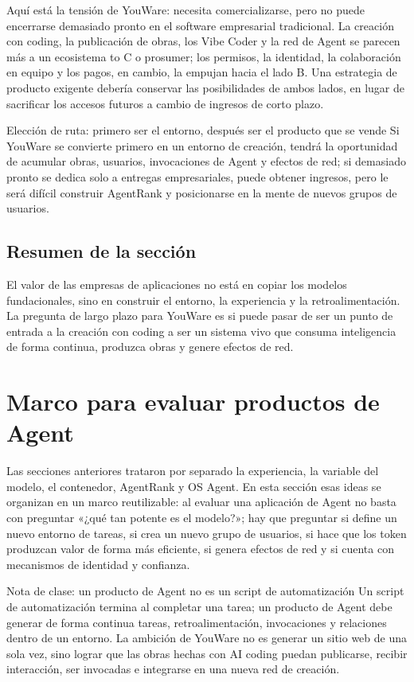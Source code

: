 \documentclass[a4paper]{article}
\begin{document}
Aquí está la tensión de YouWare: necesita comercializarse, pero no puede encerrarse demasiado pronto en el software empresarial tradicional. La creación con coding, la publicación de obras, los Vibe Coder y la red de Agent se parecen más a un ecosistema to C o prosumer; los permisos, la identidad, la colaboración en equipo y los pagos, en cambio, la empujan hacia el lado B. Una estrategia de producto exigente debería conservar las posibilidades de ambos lados, en lugar de sacrificar los accesos futuros a cambio de ingresos de corto plazo.

\begin{importantbox}{Elección de ruta: primero ser el entorno, después ser el producto que se vende}
Si YouWare se convierte primero en un entorno de creación, tendrá la oportunidad de acumular obras, usuarios, invocaciones de Agent y efectos de red; si demasiado pronto se dedica solo a entregas empresariales, puede obtener ingresos, pero le será difícil construir AgentRank y posicionarse en la mente de nuevos grupos de usuarios.
\end{importantbox}

\subsection{Resumen de la sección}

El valor de las empresas de aplicaciones no está en copiar los modelos fundacionales, sino en construir el entorno, la experiencia y la retroalimentación. La pregunta de largo plazo para YouWare es si puede pasar de ser un punto de entrada a la creación con coding a ser un sistema vivo que consuma inteligencia de forma continua, produzca obras y genere efectos de red.
\section{Marco para evaluar productos de Agent}

Las secciones anteriores trataron por separado la experiencia, la variable del modelo, el contenedor, AgentRank y OS Agent. En esta sección esas ideas se organizan en un marco reutilizable: al evaluar una aplicación de Agent no basta con preguntar «¿qué tan potente es el modelo?»; hay que preguntar si define un nuevo entorno de tareas, si crea un nuevo grupo de usuarios, si hace que los token produzcan valor de forma más eficiente, si genera efectos de red y si cuenta con mecanismos de identidad y confianza.

\begin{knowledgebox}{Nota de clase: un producto de Agent no es un script de automatización}
Un script de automatización termina al completar una tarea; un producto de Agent debe generar de forma continua tareas, retroalimentación, invocaciones y relaciones dentro de un entorno. La ambición de YouWare no es generar un sitio web de una sola vez, sino lograr que las obras hechas con AI coding puedan publicarse, recibir interacción, ser invocadas e integrarse en una nueva red de creación.
\end{knowledgebox}
\end{document}
